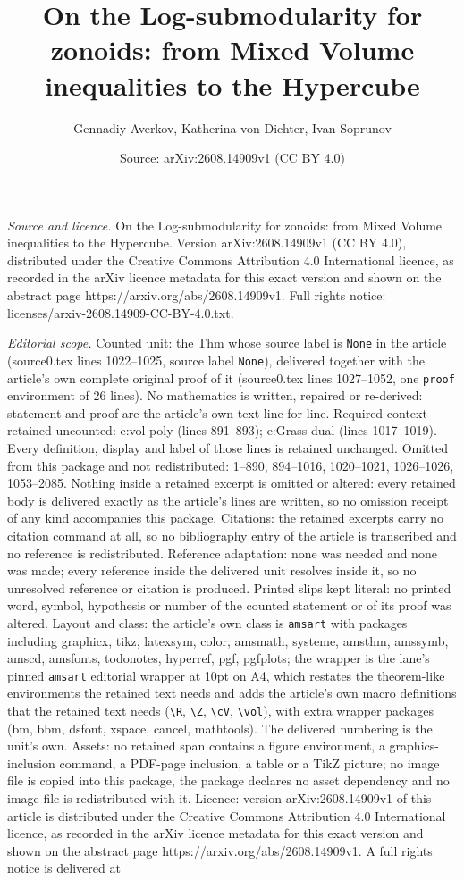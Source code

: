 \documentclass[10pt,a4paper]{amsart}
\title[On the Log-submodularity for zonoids: from Mixed Volume ineq]{On the Log-submodularity for zonoids: from Mixed Volume inequalities to the Hypercube}
\author{Gennadiy Averkov, Katherina von Dichter, Ivan Soprunov}
\date{Source: arXiv:2608.14909v1 (CC BY 4.0)}
\begin{document}
\maketitle

\noindent\emph{Source and licence.} On the Log-submodularity for zonoids: from Mixed Volume inequalities to the Hypercube. Version arXiv:2608.14909v1 (CC BY 4.0), distributed under the Creative Commons Attribution 4.0 International licence, as recorded in the arXiv licence metadata for this exact version and shown on the abstract page https://arxiv.org/abs/2608.14909v1. Full rights notice: licenses/arxiv-2608.14909-CC-BY-4.0.txt.\par\smallskip

\noindent\textit{Editorial scope.} Counted unit: the Thm whose source label is \texttt{None} in the article (source0.tex lines 1022--1025, source label \texttt{None}), delivered together with the article's own complete original proof of it (source0.tex lines 1027--1052, one \texttt{proof} environment of 26 lines). No mathematics is written, repaired or re-derived: statement and proof are the article's own text line for line. Required context retained uncounted: e:vol-poly (lines 891--893); e:Grass-dual (lines 1017--1019). Every definition, display and label of those lines is retained unchanged. Omitted from this package and not redistributed: 1--890, 894--1016, 1020--1021, 1026--1026, 1053--2085. Nothing inside a retained excerpt is omitted or altered: every retained body is delivered exactly as the article's lines are written, so no omission receipt of any kind accompanies this package. Citations: the retained excerpts carry no citation command at all, so no bibliography entry of the article is transcribed and no reference is redistributed. Reference adaptation: none was needed and none was made; every reference inside the delivered unit resolves inside it, so no unresolved reference or citation is produced. Printed slips kept literal: no printed word, symbol, hypothesis or number of the counted statement or of its proof was altered. Layout and class: the article's own class is \texttt{amsart} with packages including graphicx, tikz, latexsym, color, amsmath, systeme, amsthm, amssymb, amscd, amsfonts, todonotes, hyperref, pgf, pgfplots; the wrapper is the lane's pinned \texttt{amsart} editorial wrapper at 10pt on A4, which restates the theorem-like environments the retained text needs and adds the article's own macro definitions that the retained text needs (\texttt{\textbackslash R}, \texttt{\textbackslash Z}, \texttt{\textbackslash cV}, \texttt{\textbackslash vol}), with extra wrapper packages (bm, bbm, dsfont, xspace, cancel, mathtools). The delivered numbering is the unit's own. Assets: no retained span contains a figure environment, a graphics-inclusion command, a PDF-page inclusion, a table or a TikZ picture; no image file is copied into this package, the package declares no asset dependency and no image file is redistributed with it. Licence: version arXiv:2608.14909v1 of this article is distributed under the Creative Commons Attribution 4.0 International licence, as recorded in the arXiv licence metadata for this exact version and shown on the abstract page https://arxiv.org/abs/2608.14909v1. A full rights notice is delivered at 
\end{document}
